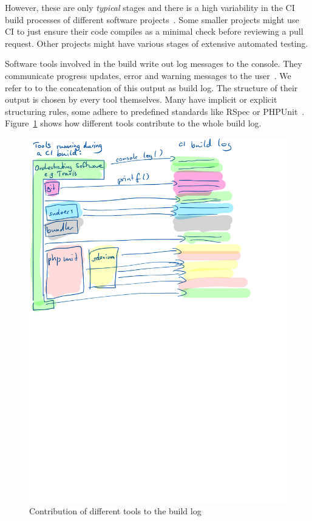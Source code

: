 \documentclass[\myrootdir/main.tex]{subfiles}
\begin{document}
However, these are only \emph{typical} stages and there is a high variability in the CI build processes of different software projects~\cite{staahl2014modeling}.
Some smaller projects might use CI to just ensure their code compiles as a minimal check before reviewing a pull request.
Other projects might have various stages of extensive automated testing.

Software tools involved in the build write out log messages to the console.
They communicate progress updates, error and warning messages to the user~\cite{yuan2012characterizing}.
We refer to to the concatenation of this output as build log.
The structure of their output is chosen by every tool themselves.
Many have implicit or explicit structuring rules, some adhere to predefined standards like RSpec or PHPUnit~\cite{phpunit2019logging,rspec2019format}.
Figure~\ref{fig:tool-log-contribution} shows how different tools contribute to the whole build log.

\begin{figure}[htbp]
	\centering
	\includegraphics[width=\textwidth, trim={0cm 15cm 0cm 0cm}, clip]{img/tool-log-contribution.pdf}
	\caption{Contribution of different tools to the build log}
	\label{fig:tool-log-contribution}
\end{figure}
\end{document}
